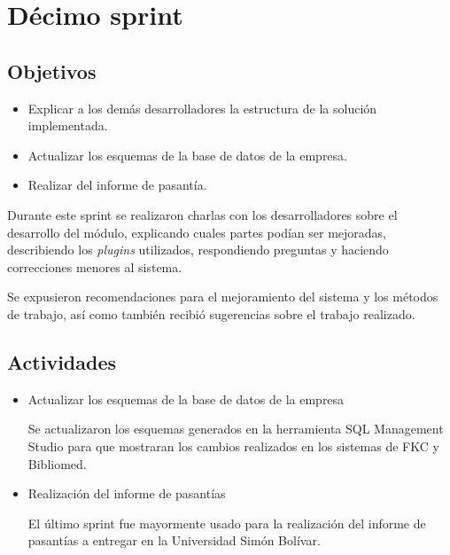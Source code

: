 \section{Décimo sprint} %
\label{sec:decimo_sprint}

\subsection{Objetivos}

\begin{itemize}
	\item Explicar a los demás desarrolladores la estructura de la solución implementada.
	\item Actualizar los esquemas de la base de datos de la empresa.
	\item Realizar del informe de pasantía.
\end{itemize}

Durante este sprint se realizaron charlas con los desarrolladores sobre el desarrollo del módulo, explicando cuales partes podían ser mejoradas, describiendo los \emph{plugins} utilizados, respondiendo preguntas y haciendo correcciones menores al sistema. 

Se expusieron recomendaciones para el mejoramiento del sistema y los métodos de trabajo, así como también recibió sugerencias sobre el trabajo realizado.

\subsection{Actividades} %
\label{sub:actividades10}

\begin{itemize}

\item Actualizar los esquemas de la base de datos de la empresa

Se actualizaron los esquemas generados en la herramienta SQL Management Studio para que mostraran los cambios realizados en los sistemas de FKC y Bibliomed.

\item Realización del informe de pasantías

El último sprint fue mayormente usado para la realización del informe de pasantías a entregar en la Universidad Simón Bolívar.

\end{itemize}


